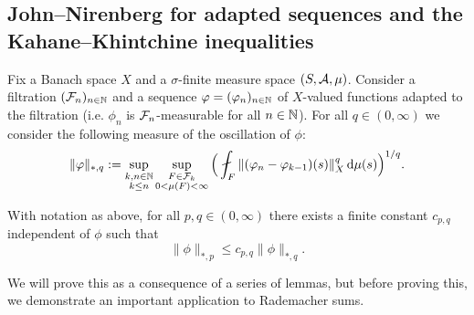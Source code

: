 \begin{thm}
  
\end{thm}


\begin{thm}
  
\end{thm}



\subsection{John--Nirenberg for adapted sequences and the Kahane--Khintchine inequalities}

Fix a Banach space $X$ and a $\sigma$-finite measure space $(S,\mathcal{A},\mu)$.
Consider a filtration $(\mathcal{F}_n)_{n \in \mathbb{N}}$ and a sequence $\varphi = (\varphi_n)_{n \in \mathbb{N}}$ of $X$-valued functions adapted to the filtration (i.e. $\phi_n$ is $\mathcal{F}_n$-measurable for all $n \in \mathbb{N}$).
For all $q \in (0,\infty)$ we consider the following measure of the oscillation of $\phi$:
\begin{equation*}
    \|\phi\|_{*,q} := \sup_{\substack{k,n \in \N \\ k \leq n}} \sup_{\substack{F \in \mc{F}_k \\ 0 < \mu(F) < \infty}} \Big( \fint_{F} \|(\phi_n - \phi_{k-1})(s)\|_{X}^{q} \, \dd\mu(s)\Big)^{1/q} .
\end{equation*}


\begin{thm}\label{thm:jn-adapted-sequences}
  With notation as above, for all $p,q \in (0,\infty)$ there exists a finite constant $c_{p,q}$ independent of $\phi$ such that
  \begin{equation*}
    \|\phi\|_{*,p} \leq c_{p,q} \|\phi\|_{*,q}.
  \end{equation*}
\end{thm}

We will prove this as a consequence of a series of lemmas, but before proving this, we demonstrate an important application to Rademacher sums.

